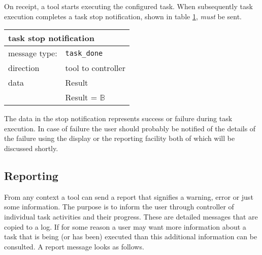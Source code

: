 \documentclass{article}
\newcommand{\msg}[1]{\texttt{#1}}
\begin{document}
   \noindent On receipt, a tool starts executing the configured task. When
   subsequently task execution completes a task stop notification, shown in
   table \ref{table:task_stop}, \emph{must} be sent.

   \begin{table}[H]
    \begin{center}
     \begin{tabular}{|ll|}
      \hline
       \multicolumn{2}{|l|}{\textbf{task stop notification}} \\
      \hline
       message type:   & \msg{task\_done} \\
      \hline
       direction       & tool to controller \\
       data            & Result \\
                       &  Result = $\mathbb{B}$ \\
      \hline
     \end{tabular}
     \label{table:task_stop}
    \end{center}
    \vspace{-0.3cm}
   \end{table}

   \noindent The data in the stop notification represents success or failure
   during task execution. In case of failure the user should probably be
   notified of the details of the failure using the display or the reporting
   facility both of which will be discussed shortly.
   

  \subsection{Reporting}

   From any context a tool can send a report that signifies a warning, error or
   just some information. The purpose is to inform the user through controller
   of individual task activities and their progress. These are detailed
   messages that are copied to a log. If for some reason a user may want more
   information about a task that is being (or has been) executed than this
   additional information can be consulted. A report message looks as follows.
   
\end{document}
